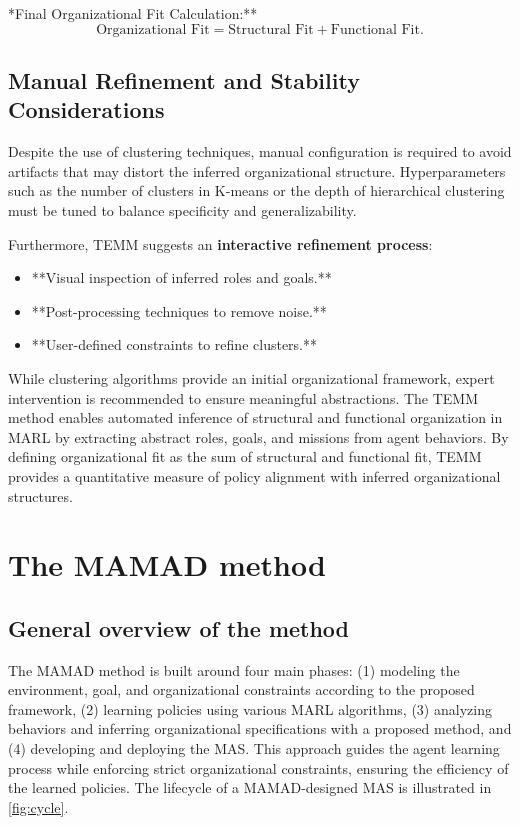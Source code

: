 \documentclass[pdflatex,sn-mathphys-num]{sn-jnl}%
\theoremstyle{thmstyleone}%
\theoremstyle{thmstyletwo}%
\theoremstyle{thmstylethree}%
\begin{document}
\noindent **Final Organizational Fit Calculation:**  
\begin{equation}
    \text{Organizational Fit} = \text{Structural Fit} + \text{Functional Fit}.
\end{equation}

\subsection{Manual Refinement and Stability Considerations}

Despite the use of clustering techniques, manual configuration is required to avoid artifacts that may distort the inferred organizational structure. Hyperparameters such as the number of clusters in K-means or the depth of hierarchical clustering must be tuned to balance specificity and generalizability.

Furthermore, TEMM suggests an \textbf{interactive refinement process}:
\begin{itemize}
    \item **Visual inspection of inferred roles and goals.**
    \item **Post-processing techniques to remove noise.**
    \item **User-defined constraints to refine clusters.**
\end{itemize}

While clustering algorithms provide an initial organizational framework, expert intervention is recommended to ensure meaningful abstractions. The TEMM method enables automated inference of structural and functional organization in MARL by extracting abstract roles, goals, and missions from agent behaviors. By defining organizational fit as the sum of structural and functional fit, TEMM provides a quantitative measure of policy alignment with inferred organizational structures.



\section{The MAMAD method}\label{sec:mamad}



\subsection{General overview of the method}

The MAMAD method is built around four main phases: (1) modeling the environment, goal, and organizational constraints according to the proposed framework, (2) learning policies using various MARL algorithms, (3) analyzing behaviors and inferring organizational specifications with a proposed method, and (4) developing and deploying the MAS. This approach guides the agent learning process while enforcing strict organizational constraints, ensuring the efficiency of the learned policies. The lifecycle of a MAMAD-designed MAS is illustrated in \autoref{fig:cycle}.
\end{document}
